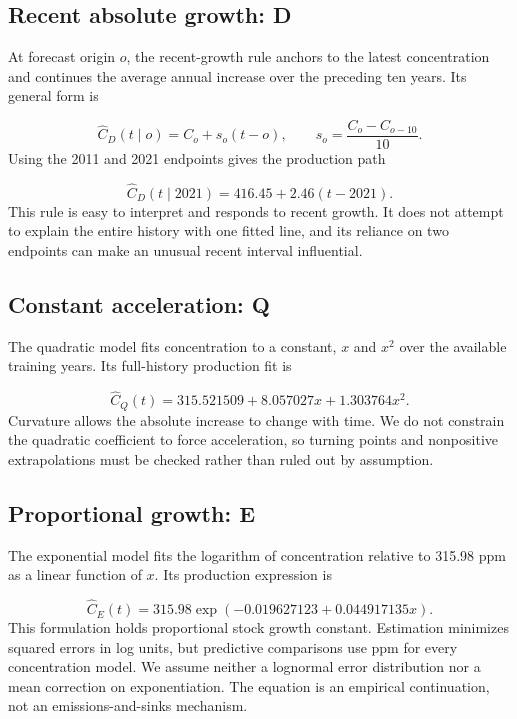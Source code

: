 \documentclass[11pt,a4paper]{article}
\newcommand{\p}[2]{#2\par}
\begin{document}
\subsection{Recent absolute growth: D}
\p{CO202}{At forecast origin $o$, the recent-growth rule anchors to the latest concentration and continues the average annual increase over the preceding ten years. Its general form is}\nopagebreak
\begin{equation}\label{eq:drift}
\widehat C_D(t\mid o)=C_o+s_o(t-o),\qquad s_o=\frac{C_o-C_{o-10}}{10}.
\end{equation}
\p{CO203}{Using the 2011 and 2021 endpoints gives the production path}\nopagebreak
\begin{equation}\label{eq:drift-production}
\widehat C_D(t\mid 2021)=416.45+2.46(t-2021).
\end{equation}
\p{CO204}{This rule is easy to interpret and responds to recent growth. It does not attempt to explain the entire history with one fitted line, and its reliance on two endpoints can make an unusual recent interval influential.}
\subsection{Constant acceleration: Q}
\p{CO205}{The quadratic model fits concentration to a constant, $x$ and $x^2$ over the available training years. Its full-history production fit is}\nopagebreak
\begin{equation}\label{eq:quadratic}
\widehat C_Q(t)=315.521509+8.057027x+1.303764x^2.
\end{equation}
\p{CO206}{Curvature allows the absolute increase to change with time. We do not constrain the quadratic coefficient to force acceleration, so turning points and nonpositive extrapolations must be checked rather than ruled out by assumption.}
\subsection{Proportional growth: E}
\p{CO207}{The exponential model fits the logarithm of concentration relative to 315.98 ppm as a linear function of $x$. Its production expression is}\nopagebreak
\begin{equation}\label{eq:exponential}
\widehat C_E(t)=315.98\exp(-0.019627123+0.044917135x).
\end{equation}
\p{CO208}{This formulation holds proportional stock growth constant. Estimation minimizes squared errors in log units, but predictive comparisons use ppm for every concentration model. We assume neither a lognormal error distribution nor a mean correction on exponentiation. The equation is an empirical continuation, not an emissions-and-sinks mechanism.}
\end{document}
